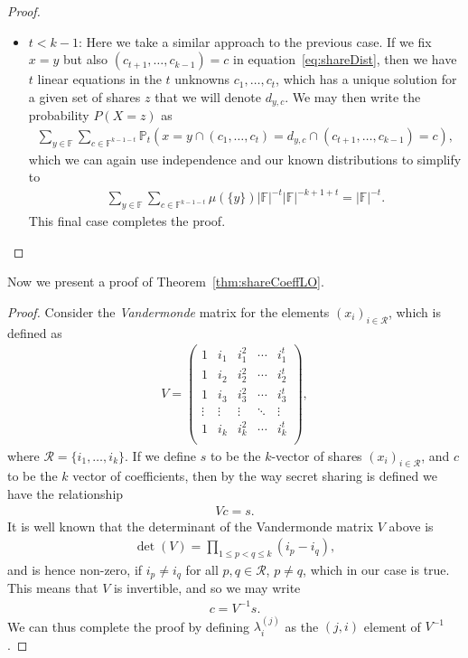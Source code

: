 \documentclass{article}
\theoremstyle{remark}
\newcommand{\F}{\mathbb{F}}
\renewcommand{\P}{\mathbb{P}}
\begin{document}
\begin{proof}
\begin{itemize}
		\item $t < k - 1$: Here we take a similar approach to the previous
			case. If we fix $x = y$ but also $(c_{t+1}, \ldots, c_{k-1}) = c$
			in equation~\eqref{eq:shareDist}, then we have $t$ linear equations
			in the $t$ unknowns $c_1, \ldots, c_t$, which has a unique solution
			for a given set of shares $z$ that we will denote $d_{y, c}$. We
			may then write the probability $P(X = z)$ as
			\begin{align*}
				\sum_{y \in \F}\sum_{c \in \F^{k - 1 - t}}
				\P_t(
					x = y \cap
					(c_1, \ldots, c_t) = d_{y, c} \cap
					(c_{t+1}, \ldots, c_{k-1}) = c
				),
			\end{align*}
			which we can again use independence and our known distributions to
			simplify to
			\begin{align*}
				\sum_{y \in \F}\sum_{c \in \F^{k - 1 - t}}
				\mu(\{y\})|\F|^{-t}|\F|^{-k+1+t}
				=
				|\F|^{-t}.
			\end{align*}
			This final case completes the proof.
	\end{itemize}
\end{proof}

Now we present a proof of Theorem~\ref{thm:shareCoeffLO}.

\begin{proof}
	Consider the \textit{Vandermonde} matrix for the elements ${(x_i)}_{i \in
	\mathcal{R}}$, which is defined as
	\begin{align*}
		V =
		\begin{pmatrix}
			1 & i_1 & i_1^2 & \cdots & i_1^t\\
			1 & i_2 & i_2^2 & \cdots & i_2^t\\
			1 & i_3 & i_3^2 & \cdots & i_3^t\\
			\vdots & \vdots & \vdots & \ddots & \vdots\\
			1 & i_k & i_k^2 & \cdots & i_k^t\\
		\end{pmatrix},
	\end{align*}
	where $\mathcal{R} = \{i_1, \ldots, i_k\}$. If we define $s$ to be the
	$k$-vector of shares ${(x_i)}_{i \in \mathcal{R}}$, and $c$ to be the $k$
	vector of coefficients, then by the way secret sharing is defined we have
	the relationship
	\begin{align*}
		Vc = s.
	\end{align*}
	It is well known that the determinant of the Vandermonde matrix $V$ above
	is
	\begin{align*}
		\det(V) = \prod_{1 \le p < q \le k} (i_p - i_q),
	\end{align*}
	and is hence non-zero, if $i_p \ne i_q$ for all $p,q \in \mathcal{R}$, $p
	\ne q$, which in our case is true. This means that $V$ is invertible, and
	so we may write
	\begin{align*}
		c = V^{-1}s.
	\end{align*}
	We can thus complete the proof by defining $\lambda_i^{(j)}$ as the $(j,
	i)$ element of $V^{-1}$.
\end{proof}
\end{document}
